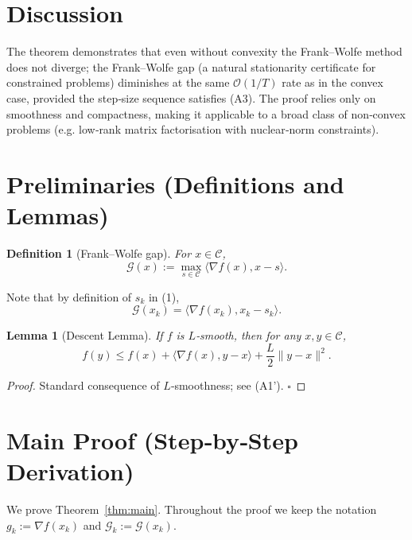 \documentclass{article}
\newtheorem{lemma}{Lemma}
\newtheorem{definition}{Definition}
\begin{document}
\section*{Discussion}
The theorem demonstrates that even without convexity the Frank–Wolfe method does not diverge; the Frank–Wolfe gap (a natural stationarity certificate for constrained problems) diminishes at the same $\mathcal O(1/T)$ rate as in the convex case, provided the step‑size sequence satisfies (A3).  The proof relies only on smoothness and compactness, making it applicable to a broad class of non‑convex problems (e.g. low‑rank matrix factorisation with nuclear‑norm constraints).

\newpage
\section*{Preliminaries (Definitions and Lemmas)}
\begin{definition}[Frank–Wolfe gap]
For $x\in\mathcal C$,
\[
\mathcal G(x):=\max_{s\in\mathcal C}\langle\nabla f(x),x-s\rangle .
\]
\end{definition}
Note that by definition of $s_k$ in (1),
\[
\mathcal G(x_k)=\langle\nabla f(x_k),x_k-s_k\rangle .
\tag{6}
\]

\begin{lemma}[Descent Lemma]\label{lem:descent}
If $f$ is $L$‑smooth, then for any $x,y\in\mathcal C$,
\[
f(y)\le f(x)+\langle\nabla f(x),y-x\rangle+\frac{L}{2}\|y-x\|^{2}.
\tag{7}
\]
\end{lemma}
\begin{proof}
Standard consequence of $L$‑smoothness; see (A1'). \hfill $\square$
\end{proof}

\section*{Main Proof (Step‑by‑Step Derivation)}
We prove Theorem~\ref{thm:main}.  Throughout the proof we keep the notation $g_k:=\nabla f(x_k)$ and $\mathcal G_k:=\mathcal G(x_k)$.
\end{document}
